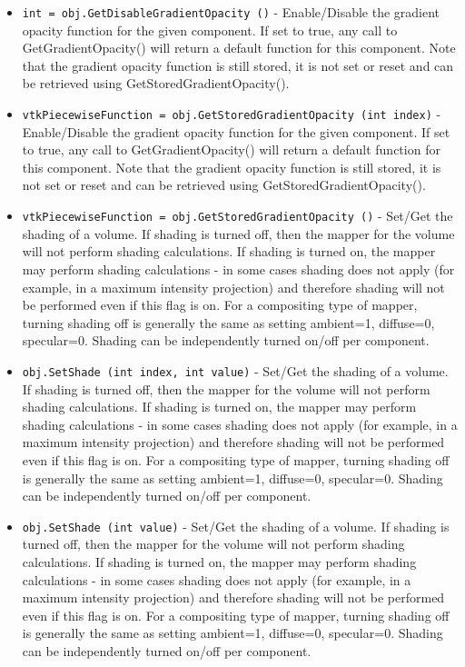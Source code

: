 \begin{itemize}
\item  \verb|int = obj.GetDisableGradientOpacity ()| -  Enable/Disable the gradient opacity function for the given component. 
 If set to true, any call to GetGradientOpacity() will return a default
 function for this component. Note that the gradient opacity function is 
 still stored, it is not set or reset and can be retrieved using 
 GetStoredGradientOpacity().

\item  \verb|vtkPiecewiseFunction = obj.GetStoredGradientOpacity (int index)| -  Enable/Disable the gradient opacity function for the given component. 
 If set to true, any call to GetGradientOpacity() will return a default
 function for this component. Note that the gradient opacity function is 
 still stored, it is not set or reset and can be retrieved using 
 GetStoredGradientOpacity().

\item  \verb|vtkPiecewiseFunction = obj.GetStoredGradientOpacity ()| -  Set/Get the shading of a volume. If shading is turned off, then
 the mapper for the volume will not perform shading calculations.
 If shading is turned on, the mapper may perform shading 
 calculations - in some cases shading does not apply (for example,
 in a maximum intensity projection) and therefore shading will
 not be performed even if this flag is on. For a compositing type
 of mapper, turning shading off is generally the same as setting
 ambient=1, diffuse=0, specular=0. Shading can be independently
 turned on/off per component.

\item  \verb|obj.SetShade (int index, int value)| -  Set/Get the shading of a volume. If shading is turned off, then
 the mapper for the volume will not perform shading calculations.
 If shading is turned on, the mapper may perform shading 
 calculations - in some cases shading does not apply (for example,
 in a maximum intensity projection) and therefore shading will
 not be performed even if this flag is on. For a compositing type
 of mapper, turning shading off is generally the same as setting
 ambient=1, diffuse=0, specular=0. Shading can be independently
 turned on/off per component.

\item  \verb|obj.SetShade (int value)| -  Set/Get the shading of a volume. If shading is turned off, then
 the mapper for the volume will not perform shading calculations.
 If shading is turned on, the mapper may perform shading 
 calculations - in some cases shading does not apply (for example,
 in a maximum intensity projection) and therefore shading will
 not be performed even if this flag is on. For a compositing type
 of mapper, turning shading off is generally the same as setting
 ambient=1, diffuse=0, specular=0. Shading can be independently
 turned on/off per component.


\end{itemize}
